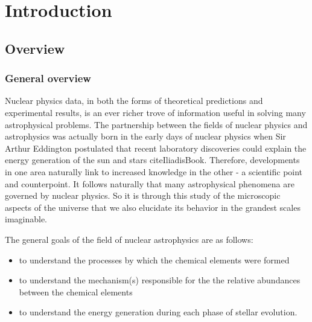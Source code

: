 %
%
%
%
%
%
%
%
%
%


%
%

\chapter{Introduction}
\label{chap: introduction}

\section{Overview}
\label{sec: Nuclear astrophysics overview}

\subsection{General overview}

Nuclear physics data, in both the forms of theoretical predictions and experimental results, is an ever richer trove of information useful in solving many astrophysical problems. The partnership between the fields of nuclear physics and astrophysics was actually born in the early days of nuclear physics when Sir Arthur Eddington postulated that recent laboratory discoveries could explain the energy generation of the sun and stars cite{IliadisBook}. Therefore, developments in one area naturally link to increased knowledge in the other - a scientific point and counterpoint. It follows naturally that many astrophysical phenomena are governed by nuclear physics. So it is through this study of the microscopic aspects of the universe that we also elucidate its behavior in the grandest scales imaginable. 

The general goals of the field of nuclear astrophysics are as follows:
\begin{itemize}
\item to understand the processes by which the chemical elements were formed
\item to understand the mechanism(s) responsible for the the relative abundances between the chemical elements
\item to understand the energy generation during each phase of stellar evolution.
\end{itemize}

